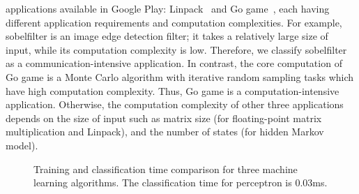 \documentclass[10pt, conference, compsocconf]{IEEEtran}
\begin{document}
{{applications available in Google Play: Linpack~\cite{linpack} and 
Go game~\cite{go}, each having different application requirements 
and computation complexities.
%
For example, sobelfilter is an image edge detection filter; it
takes a relatively large size of input, while its computation complexity
is low.
%
Therefore, we classify sobelfilter as a communication-intensive
application.
%
In contrast, the core computation of Go game is a Monte Carlo
algorithm with iterative random sampling tasks which have high
computation complexity.
%
Thus, Go game is a computation-intensive application.
%
Otherwise, the computation complexity of other three applications
depends on the size of input such as matrix size (for floating-point matrix
multiplication and Linpack), and the number of states (for hidden Markov
model).
%
%
%
%
%
\begin{figure}
\centering
{}
\caption{Training and classification time comparison for three machine
learning algorithms. The classification time for perceptron is 0.03ms.}
\end{figure}
%
}}
\end{document}
